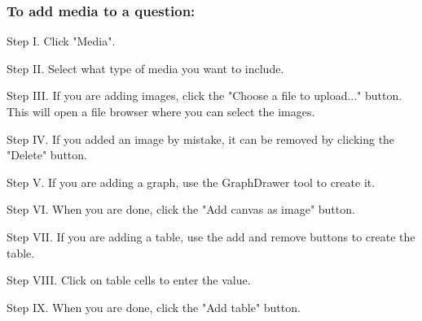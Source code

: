 \subsubsection{To add media to a question:}
\begin{userManualItemlist}
    \item[Step I.] Click "Media".
    \item[Step II.] Select what type of media you want to include.
    \item[Step III.] If you are adding images, click the "Choose a file to upload..." button. This will open a file browser where you can select the images.
    \item[Step IV.] If you added an image by mistake, it can be removed by clicking the "Delete" button.
    \item[Step V.] If you are adding a graph, use the GraphDrawer tool to create it.
    \item[Step VI.] When you are done, click the "Add canvas as image" button.
    \item[Step VII.] If you are adding a table, use the add and remove buttons to create the table.
    \item[Step VIII.] Click on table cells to enter the value.
    \item[Step IX.] When you are done, click the "Add table" button.
\end{userManualItemlist}
